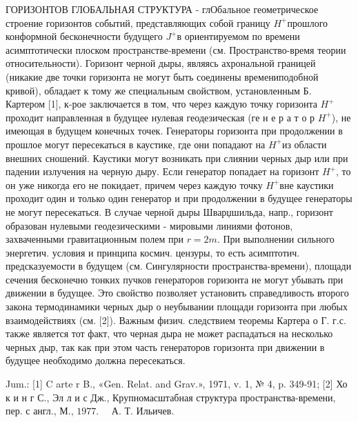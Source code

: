 \documentclass[10pt]{article}
\begin{document}
ГОРИЗОНТОВ ГЛОБАЛЬНАЯ СТРУКТУРА - глОбальное геометрическое строение горизонтов событий, представляющих собой границу $H^{+}$прошлого конформной бесконечности будущего $J^{+}$в ориентируемом по времени асимптотически плоском пространстве-времени (см. Пространство-время теории относительности). Горизонт черной дыры, являясь ахрональной границей (никакие две точки горизонта не могут быть соединены времениподобной кривой), обладает к тому же специальным свойством, установленным Б. Картером [1], к-рое заключается в том, что через каждую точку горизонта $H^{+}$проходит направленная в будущее нулевая геодезическая (ге н е р а т о р $H^{+}$), не имеющая в будущем конечных точек. Генераторы горизонта при продолжении в прошлое могут пересекаться в каустике, где они попадают на $H^{+}$из области внешних сношений. Каустики могут возникать при слиянии черных дыр или при падении излучения на черную дыру. Если генератор попадает на горизонт $H^{+}$, то он уже никогда его не покидает, причем через каждую точку $H^{+}$вне каустики проходит один и только один генератор и при продолжении в будущее генераторы не могут пересекаться. В случае черной дыры Шварџшильда, напр., горизонт образован нулевыми геодезическими - мировыми линиями фотонов, захваченными гравитационным полем при $r=2 m$. При выполнении сильного энергетич. условия и принципа космич. цензуры, то есть асимптотич. предсказуемости в будущем (см. Сингулярности пространства-времени), площади сечения бесконечно тонких пучков генераторов горизонта не могут убывать при движении в будущее. Это свойство позволяет установить справедливость второго закона термодинамики черных дыр о неубывании площади горизонта при любых взаимодействиях (см. [2]). Важным физич. следствием теоремы Картера о Г. г.с. также является тот факт, что черная дыра не может распадаться на несколько черных дыр, так как при этом часть генераторов горизонта при движении в будущее необходимо должна пересекаться.



Jum.: [1] C arte r B., «Gen. Relat. and Grav.», 1971, v. 1, № 4, p. 349-91; [2] Хо к и н г С., Эл л и с Дж., Крупномасштабная структура пространства-времени, пер. с англ., М., $1977 . \quad$ А. Т. Ильичев.
\end{document}
